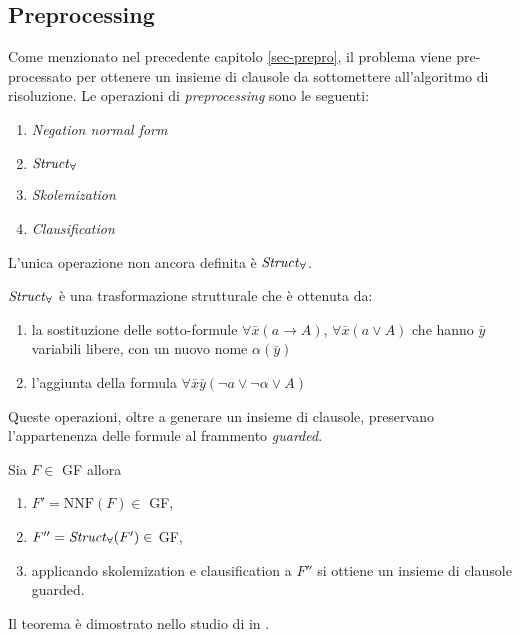 \subsection{Preprocessing}
Come menzionato nel precedente capitolo \ref{sec-prepro}, il problema viene pre-processato per ottenere un insieme di clausole 
da sottomettere all'algoritmo di risoluzione. Le operazioni di \emph{preprocessing} sono le seguenti:
\begin{enumerate}
    \item \emph{Negation normal form} 
    \item $\text{\emph{Struct}}_\forall$
    \item \emph{Skolemization}
    \item \emph{Clausification}
\end{enumerate} 
L'unica operazione non ancora definita è $\text{\emph{Struct}}_\forall$.
\begin{definition}\label{struct-def}
    $\text{\emph{Struct}}_\forall$ è una trasformazione strutturale che è ottenuta da:
    \begin{enumerate}
        \item la sostituzione delle sotto-formule $\forall\bar{x}(a \rightarrow A)$, $\forall\bar{x}(a \lor A)$ che hanno 
        $\bar{y}$ variabili libere, con un nuovo nome $\alpha(\bar{y})$
        \item l'aggiunta della formula $\forall\bar{x}\bar{y}(\lnot a \lor \lnot\alpha \lor A)$
    \end{enumerate}
\end{definition}
Queste operazioni, oltre a generare un insieme di clausole, preservano l'appartenenza delle formule al frammento \emph{guarded}.
\begin{theorem}
    Sia $F\in$ GF allora 
    \begin{enumerate}
        \item $F'=\text{NNF}(F) \in$ GF,
        \item $F''=\text{\emph{Struct}}_\forall(F') \in$ GF,
        \item applicando skolemization e clausification a $F''$ si ottiene un insieme di clausole guarded.
    \end{enumerate}
\end{theorem}
Il teorema è dimostrato nello studio di \citeauthor{de2003deciding} in \cite{de2003deciding}.
